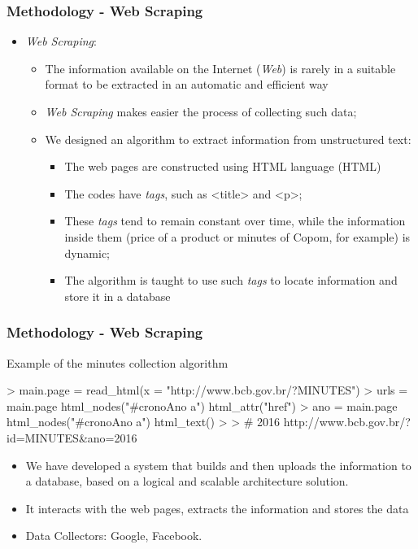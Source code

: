 \documentclass[aspectratio=169]{beamer}
\begin{document}
\begin{frame}\frametitle{Methodology - Web Scraping}
  \begin{itemize}
  \item \emph{Web Scraping}:
    \begin{itemize}
      \item The information available on the Internet (\emph{Web}) is rarely in a suitable format to be extracted in an automatic and efficient way
      \item \emph{Web Scraping} makes easier the process of collecting such data;
      \item We designed an algorithm to extract information from unstructured text:
      \begin{itemize}
        \item The web pages are constructed using HTML language (HTML)
        \item The codes have \emph{tags}, such as <title> and <p>;
        \item These \emph{tags} tend to remain constant over time, while the information inside them (price of a product or minutes of Copom, for example) is dynamic;
        \item The algorithm is taught to use such \emph{tags} to locate information and store it in a database
      \end{itemize}
    \end{itemize}
  \end{itemize}
\end{frame}

\begin{frame}[fragile]\frametitle{Methodology - Web Scraping} 
  \begin{block}{Example of the minutes collection algorithm}
\begin{Schunk}
\begin{Sinput}
> main.page = read_html(x = "http://www.bcb.gov.br/?MINUTES")
> urls = main.page %
    html_nodes("#cronoAno a") %
    html_attr("href")  
> ano = main.page %
    html_nodes("#cronoAno a") %
    html_text() 
> 
> # 2016 http://www.bcb.gov.br/?id=MINUTES&ano=2016                                               
\end{Sinput}
\end{Schunk}
  \end{block}
  \begin{itemize}
    \item We have developed a system that builds and then uploads the information to a database, based on a logical and scalable architecture solution.
    \item It interacts with the web pages, extracts the information and stores the data
    \item Data Collectors: Google, Facebook.
  \end{itemize}
\end{frame}
\end{document}
